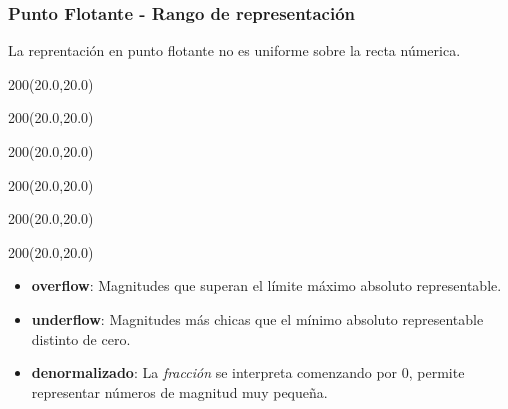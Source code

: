 \documentclass[aspectratio=169]{beamer}
\begin{document}
\begin{frame}[fragile,t]
    \frametitle{Punto Flotante - Rango de representación}
    \begin{block}{\small La reprentación en punto flotante no es uniforme sobre la recta númerica.}
    \vspace{3.2cm}
    \end{block}
    \begin{textblock}{200}(20.0,20.0)   \end{textblock} %
    \begin{textblock}{200}(20.0,20.0)   \end{textblock} %
    \begin{textblock}{200}(20.0,20.0)   \end{textblock} %
    \begin{textblock}{200}(20.0,20.0)   \end{textblock} %
    \begin{textblock}{200}(20.0,20.0)   \end{textblock} %
    \begin{textblock}{200}(20.0,20.0)   \end{textblock} %
    \small
    \begin{itemize}
    \item<4-> \textbf{overflow}: Magnitudes que superan el límite máximo absoluto representable.
    \item<5-> \textbf{underflow}: Magnitudes más chicas que el mínimo absoluto representable distinto de cero.
    \item<6-> \textbf{denormalizado}: La \textit{fracción} se interpreta comenzando por 0, permite representar números de magnitud muy pequeña.
    \end{itemize}
\end{frame}
\end{document}
